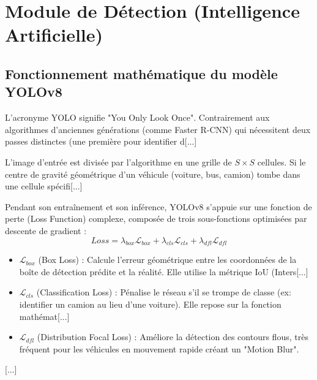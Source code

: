 \section{Module de Détection (Intelligence Artificielle)}

\subsection{Fonctionnement mathématique du modèle YOLOv8}
L'acronyme YOLO signifie "You Only Look Once". Contrairement aux algorithmes d'anciennes générations (comme Faster R-CNN) qui nécessitent deux passes distinctes (une première pour identifier d[...]

L'image d'entrée est divisée par l'algorithme en une grille de $S \times S$ cellules. Si le centre de gravité géométrique d'un véhicule (voiture, bus, camion) tombe dans une cellule spécifi[...]

Pendant son entraînement et son inférence, YOLOv8 s'appuie sur une fonction de perte (Loss Function) complexe, composée de trois sous-fonctions optimisées par descente de gradient :
\begin{equation}
Loss = \lambda_{box} \mathcal{L}_{box} + \lambda_{cls} \mathcal{L}_{cls} + \lambda_{dfl} \mathcal{L}_{dfl}
\end{equation}

\begin{itemize}
    \item \textbf{$\mathcal{L}_{box}$} (Box Loss) : Calcule l'erreur géométrique entre les coordonnées de la boîte de détection prédite et la réalité. Elle utilise la métrique IoU (Inters[...]
    \item \textbf{$\mathcal{L}_{cls}$} (Classification Loss) : Pénalise le réseau s'il se trompe de classe (ex: identifier un camion au lieu d'une voiture). Elle repose sur la fonction mathémat[...]
    \item \textbf{$\mathcal{L}_{dfl}$} (Distribution Focal Loss) : Améliore la détection des contours flous, très fréquent pour les véhicules en mouvement rapide créant un "Motion Blur".
\end{itemize}
[...]